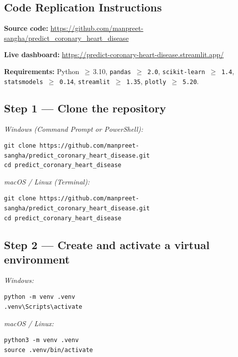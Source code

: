 \documentclass[12pt,a4paper]{article}
\begin{document}
\newpage
\begin{appendices}

\section{Code Replication Instructions}

\noindent\textbf{Source code:}\quad
\url{https://github.com/manpreet-sangha/predict_coronary_heart_disease}

\noindent\textbf{Live dashboard:}\quad
\url{https://predict-coronary-heart-disease.streamlit.app/}

\noindent\textbf{Requirements:} Python~$\geq$\,3.10,
\texttt{pandas\,$\geq$\,2.0}, \texttt{scikit-learn\,$\geq$\,1.4},
\texttt{statsmodels\,$\geq$\,0.14}, \texttt{streamlit\,$\geq$\,1.35},
\texttt{plotly\,$\geq$\,5.20}.

\subsection*{Step 1 — Clone the repository}

\noindent\textit{Windows (Command Prompt or PowerShell):}
\begin{lstlisting}
git clone https://github.com/manpreet-sangha/predict_coronary_heart_disease.git
cd predict_coronary_heart_disease
\end{lstlisting}

\noindent\textit{macOS / Linux (Terminal):}
\begin{lstlisting}
git clone https://github.com/manpreet-sangha/predict_coronary_heart_disease.git
cd predict_coronary_heart_disease
\end{lstlisting}

\subsection*{Step 2 — Create and activate a virtual environment}

\noindent\textit{Windows:}
\begin{lstlisting}
python -m venv .venv
.venv\Scripts\activate
\end{lstlisting}

\noindent\textit{macOS / Linux:}
\begin{lstlisting}
python3 -m venv .venv
source .venv/bin/activate
\end{lstlisting}


\end{appendices}
\end{document}
